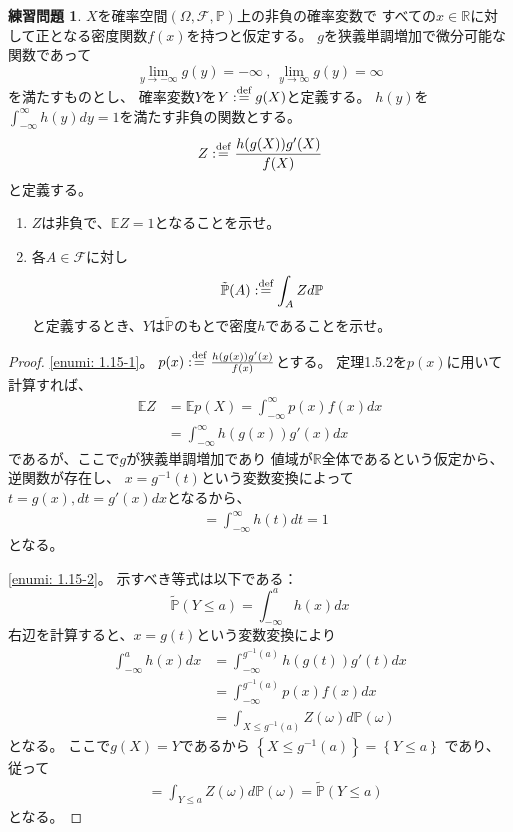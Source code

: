 \documentclass[uplatex]{jsarticle}
\theoremstyle{definition}
\newtheorem{prob}[prob]{練習問題}
\def\R{\mathbb{R}}
\def\P{\mathbb{P}}
\def\E{\mathbb{E}}
\def\mcF{\mathcal{F}}
\def\dfn{:\overset{\mbox{{\scriptsize def}}}{=}}
\begin{document}
\begin{prob}\label{prob: 1.15}
  \(X\)を確率空間\((\Omega,\mcF,\P)\)上の非負の確率変数で
  すべての\(x\in \R\)に対して正となる密度関数\(f(x)\)を持つと仮定する。
  \(g\)を狭義単調増加で微分可能な関数であって
  \[
  \lim_{y\to -\infty}g(y) = -\infty  \ , \
  \lim_{y\to \infty}g(y) = \infty
  \]
  を満たすものとし、
  確率変数\(Y\)を\(Y\dfn g(X)\)と定義する。
  \(h(y)\)を\(\int_{-\infty}^\infty h(y)dy = 1\)を満たす非負の関数とする。
  \[
  Z \dfn \frac{h(g(X))g'(X)}{f(X)}
  \]
  と定義する。
  \begin{enumerate}
    \item \label{enumi: 1.15-1}
    \(Z\)は非負で、\(\E Z=1\)となることを示せ。
    \item \label{enumi: 1.15-2}
    各\(A\in \mcF\)に対し
    \[
    \tilde{\P}(A) \dfn \int_A Zd\P
    \]
    と定義するとき、\(Y\)は\(\tilde{\P}\)のもとで密度\(h\)であることを示せ。
  \end{enumerate}
\end{prob}



\begin{proof}
  \ref{enumi: 1.15-1}。
  \(p(x) \dfn \frac{h(g(x))g'(x)}{f(x)}\)とする。
  定理1.5.2を\(p(x)\)に用いて計算すれば、
  \begin{align*}
    \E Z &= \E p(X) = \int_{-\infty}^\infty p(x)f(x) dx \\
    &= \int_{-\infty}^\infty h(g(x))g'(x) dx
  \end{align*}
  であるが、ここで\(g\)が狭義単調増加であり
  値域が\(\R\)全体であるという仮定から、
  逆関数が存在し、
  \(x=g^{-1}(t)\)という変数変換によって\(t = g(x) , dt = g'(x)dx\)となるから、
  \begin{align*}
    &= \int_{-\infty}^\infty h(t)dt = 1
  \end{align*}
  となる。

  \ref{enumi: 1.15-2}。
  示すべき等式は以下である：
  \[
  \tilde{\P}(Y \leq a) = \int_{-\infty}^a h(x)dx
  \]
  右辺を計算すると、\(x=g(t)\)という変数変換により
  \begin{align*}
    \int_{-\infty}^a h(x)dx
    &= \int_{-\infty}^{g^{-1}(a)} h(g(t))g'(t) dx \\
    &= \int_{-\infty}^{g^{-1}(a)} p(x)f(x) dx \\
    &= \int_{X \leq g^{-1}(a)}Z(\omega)d\P(\omega)
  \end{align*}
  となる。
  ここで\(g(X) = Y\)であるから
  \(\left\{ X \leq g^{-1}(a) \right\} = \left\{ Y \leq a \right\}\)
  であり、従って
  \begin{align*}
    &= \int_{Y \leq a}Z(\omega)d\P(\omega) = \tilde{\P}(Y \leq a)
  \end{align*}
  となる。
\end{proof}
\end{document}
